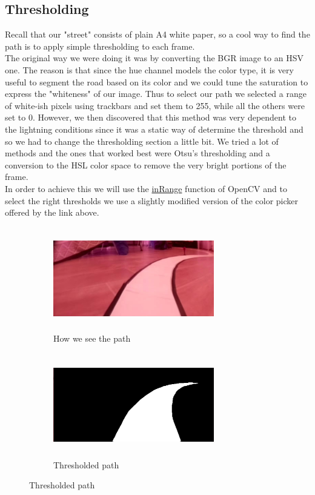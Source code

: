 \documentclass[12pt,a4paper]{article}
\begin{document}
\begin{large}
\subsection{Thresholding}
Recall that our "street" consists of plain A4 white paper, so a cool way to find the path is to apply simple thresholding to each frame.\\
The original way we were doing it was by converting the BGR image to an HSV one. The reason is that since the hue channel models the color type, it is very useful to segment the road based on its color and we could tune the saturation to express the "whiteness" of our image. Thus to select our path we selected a range of white-ish pixels using trackbars and set them to 255, while all the others were set to 0. However, we then discovered that this method was very dependent to the lightning conditions since it was a static way of determine the threshold and so we had to change the thresholding section a little bit. We tried a lot of methods and the ones that worked best were Otsu's thresholding and a conversion to the HSL color space to remove the very bright portions of the frame.\\
In order to achieve this we will use the \href{https://docs.opencv.org/3.4/da/d97/tutorial_threshold_inRange.html}{inRange} function of OpenCV and to select the right thresholds we use a slightly modified version of the color picker offered by the link above.

\begin{figure} [!htb]
  \centering
    \begin{subfigure}[b]{0.4\textwidth}
    \centering
    \captionsetup{justification=centering}
      \includegraphics[width=7cm, height = 4.5cm]{images/normal2.jpg}
      \caption{How we see the path}
      
    \end{subfigure}
    \hspace{1cm}
    \begin{subfigure}[b]{0.4\textwidth}
    \centering
    \captionsetup{justification=centering}
      \includegraphics[width= 7cm, height = 4.5cm]{images/thres2.jpg}
      \caption{Thresholded path \\}
      

\end{subfigure}
\end{figure}
\end{large}
\end{document}
